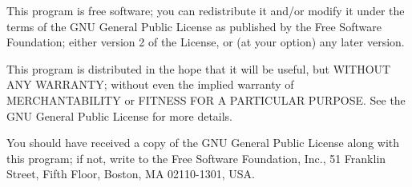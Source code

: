 \documentclass[10pt,a4paper]{article}
\begin{document}
This program is free software; you can redistribute it 
and/or modify it under the terms of the GNU General Public 
License as published by the Free Software Foundation;
either version 2 of the License, or (at your option) any 
later version.

This program is distributed in the hope that it will be 
useful, but WITHOUT ANY WARRANTY; without even the implied 
warranty of MERCHANTABILITY or FITNESS FOR A PARTICULAR 
PURPOSE.  See the GNU General Public License for more 
details.

You should have received a copy of the GNU General Public 
License along with this program; if not, write to the Free 
Software Foundation, Inc., 51 Franklin Street, Fifth Floor, 
Boston, MA  02110-1301, USA.
\end{document}
